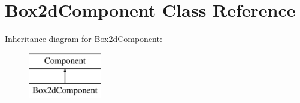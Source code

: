 \hypertarget{classBox2dComponent}{}\section{Box2d\+Component Class Reference}
\label{classBox2dComponent}
Inheritance diagram for Box2d\+Component\+:\begin{figure}[H]
\begin{center}
\leavevmode
\includegraphics[height=2.000000cm]{classBox2dComponent}
\end{center}
\end{figure}
